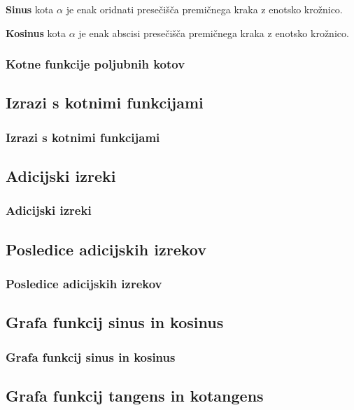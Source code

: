         \begin{frame}
            \textbf{Sinus} kota $\alpha$ je enak oridnati presečišča premičnega kraka z enotsko krožnico.

            \textbf{Kosinus} kota $\alpha$ je enak abscisi presečišča premičnega kraka z enotsko krožnico.

        \end{frame}

        \begin{frame}
            \frametitle{Kotne funkcije poljubnih kotov}
        \end{frame}

    \subsection{Izrazi s kotnimi funkcijami}

        \begin{frame}
            \frametitle{Izrazi s kotnimi funkcijami}
        \end{frame}

    \subsection{Adicijski izreki}

        \begin{frame}
            \frametitle{Adicijski izreki}
        \end{frame}

    \subsection{Posledice adicijskih izrekov}

        \begin{frame}
            \frametitle{Posledice adicijskih izrekov}
        \end{frame}

    \subsection{Grafa funkcij sinus in kosinus}

        \begin{frame}
            \frametitle{Grafa funkcij sinus in kosinus}
        \end{frame}

    \subsection{Grafa funkcij tangens in kotangens}


